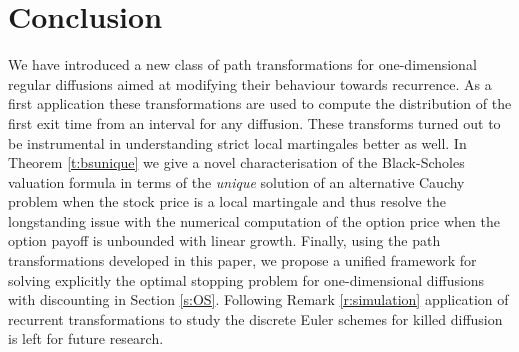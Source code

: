 \documentclass[11pt,reqno]{amsart}
\numberwithin{equation}{section}
\begin{document}
\section{Conclusion} \label{s:conc}
We have introduced a new class of path transformations for one-dimensional regular diffusions aimed at modifying their behaviour towards recurrence. As a first application these transformations are used to compute the distribution of the first exit time from an interval for any diffusion. These transforms turned out to be instrumental in understanding strict local martingales better as well.  In Theorem \ref{t:bsunique} we give a novel characterisation of the Black-Scholes valuation formula in terms of the {\em unique} solution of an alternative Cauchy problem when the stock price is a local martingale and thus resolve the longstanding issue with the numerical computation of the option price when the option payoff is unbounded with linear growth. Finally, using the path transformations developed in this paper, we propose a unified framework for solving explicitly the optimal stopping problem for one-dimensional diffusions with discounting in Section \ref{s:OS}. Following Remark \ref{r:simulation} application of recurrent transformations to study the discrete Euler schemes for killed diffusion is left for future research.


\appendix
\end{document}
